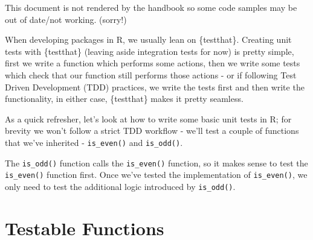 \documentclass[
  letterpaper,
  DIV=11,
  numbers=noendperiod]{scrreprt}
\begin{document}
\begin{tcolorbox}[enhanced jigsaw, colback=white, opacitybacktitle=0.6, coltitle=black, left=2mm, breakable, bottomtitle=1mm, toptitle=1mm, toprule=.15mm, colframe=quarto-callout-warning-color-frame, titlerule=0mm, title=\textcolor{quarto-callout-warning-color}{\faExclamationTriangle}\hspace{0.5em}{Warning}, colbacktitle=quarto-callout-warning-color!10!white, rightrule=.15mm, bottomrule=.15mm, arc=.35mm, opacityback=0, leftrule=.75mm]

This document is not rendered by the handbook so some code samples may
be out of date/not working. (sorry!)

\end{tcolorbox}

When developing packages in R, we usually lean on \{testthat\}. Creating
unit tests with \{testthat\} (leaving aside integration tests for now)
is pretty simple, first we write a function which performs some actions,
then we write some tests which check that our function still performs
those actions - or if following Test Driven Development (TDD) practices,
we write the tests first and then write the functionality, in either
case, \{testthat\} makes it pretty seamless.

As a quick refresher, let's look at how to write some basic unit tests
in R; for brevity we won't follow a strict TDD workflow - we'll test a
couple of functions that we've inherited - \texttt{is\_even()} and
\texttt{is\_odd()}.

\begin{tcolorbox}[enhanced jigsaw, colback=white, opacitybacktitle=0.6, coltitle=black, left=2mm, breakable, bottomtitle=1mm, toptitle=1mm, toprule=.15mm, colframe=quarto-callout-tip-color-frame, titlerule=0mm, title=\textcolor{quarto-callout-tip-color}{\faLightbulb}\hspace{0.5em}{Tip}, colbacktitle=quarto-callout-tip-color!10!white, rightrule=.15mm, bottomrule=.15mm, arc=.35mm, opacityback=0, leftrule=.75mm]

The \texttt{is\_odd()} function calls the \texttt{is\_even()} function,
so it makes sense to test the \texttt{is\_even()} function first. Once
we've tested the implementation of \texttt{is\_even()}, we only need to
test the additional logic introduced by \texttt{is\_odd()}.

\end{tcolorbox}

\section{Testable Functions}\label{testable-functions}
\end{document}
